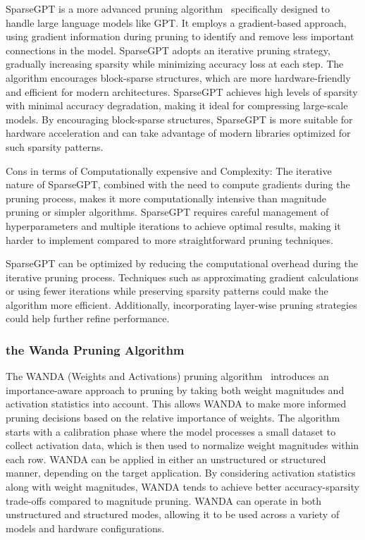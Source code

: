 \documentclass{article} %
\begin{document}
SparseGPT is a more advanced pruning algorithm~\citep{sparsegpt23} specifically designed to handle large language models like GPT. It employs a gradient-based approach, using gradient information during pruning to identify and remove less important connections in the model. SparseGPT adopts an iterative pruning strategy, gradually increasing sparsity while minimizing accuracy loss at each step. The algorithm encourages block-sparse structures, which are more hardware-friendly and efficient for modern architectures. SparseGPT achieves high levels of sparsity with minimal accuracy degradation, making it ideal for compressing large-scale models. By encouraging block-sparse structures, SparseGPT is more suitable for hardware acceleration and can take advantage of modern libraries optimized for such sparsity patterns.

Cons in terms of Computationally expensive and Complexity: The iterative nature of SparseGPT, combined with the need to compute gradients during the pruning process, makes it more computationally intensive than magnitude pruning or simpler algorithms. SparseGPT requires careful management of hyperparameters and multiple iterations to achieve optimal results, making it harder to implement compared to more straightforward pruning techniques.

SparseGPT can be optimized by reducing the computational overhead during the iterative pruning process. Techniques such as approximating gradient calculations or using fewer iterations while preserving sparsity patterns could make the algorithm more efficient. Additionally, incorporating layer-wise pruning strategies could help further refine performance.

\subsubsection{the Wanda Pruning Algorithm}

The WANDA (Weights and Activations) pruning algorithm~\citep{wanda24} introduces an importance-aware approach to pruning by taking both weight magnitudes and activation statistics into account. This allows WANDA to make more informed pruning decisions based on the relative importance of weights. The algorithm starts with a calibration phase where the model processes a small dataset to collect activation data, which is then used to normalize weight magnitudes within each row. WANDA can be applied in either an unstructured or structured manner, depending on the target application. By considering activation statistics along with weight magnitudes, WANDA tends to achieve better accuracy-sparsity trade-offs compared to magnitude pruning. WANDA can operate in both unstructured and structured modes, allowing it to be used across a variety of models and hardware configurations.
\end{document}

